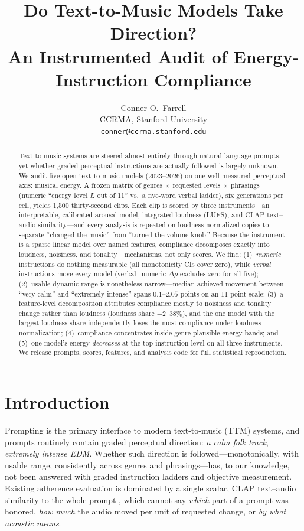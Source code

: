 \documentclass{article}
\title{Do Text-to-Music Models Take Direction?\\
An Instrumented Audit of Energy-Instruction Compliance}
\author{Conner O.\ Farrell\\
  CCRMA, Stanford University\\
  \texttt{conner@ccrma.stanford.edu}}
\begin{document}
\maketitle

\begin{abstract}
Text-to-music systems are steered almost entirely through natural-language prompts, yet whether graded perceptual instructions are actually followed is largely unknown. We audit five open text-to-music models
(2023--2026) on one well-measured perceptual axis: musical energy. A frozen matrix of genres $\times$ requested levels $\times$ phrasings (numeric ``energy level $L$ out of 11'' vs.\ a five-word verbal ladder), six generations per cell, yields 1{,}500 thirty-second clips. Each clip is scored by three instruments---an
interpretable, calibrated arousal model, integrated loudness (LUFS), and CLAP
text--audio similarity---and every analysis is repeated on loudness-normalized
copies to separate ``changed the music'' from ``turned the volume knob.''
Because the instrument is a sparse linear model over named features, compliance decomposes exactly into loudness, noisiness, and tonality---mechanisms, not only scores. We find:
(1)~\emph{numeric} instructions do nothing measurable (all monotonicity CIs
cover zero), while \emph{verbal} instructions move every model (verbal$-$numeric
$\Delta\rho$ excludes zero for all five); (2)~usable dynamic range is
nonetheless narrow---median achieved movement between ``very calm'' and
``extremely intense'' spans $0.1$--$2.05$ points on an 11-point scale;
(3)~a feature-level decomposition attributes compliance mostly to noisiness and
tonality change rather than loudness (loudness share $-2$--$38\%$), and the one
model with the largest loudness share independently loses the most compliance
under loudness normalization; (4)~compliance concentrates inside
genre-plausible energy bands; and (5)~one model's energy \emph{decreases} at the
top instruction level on all three instruments. We release prompts, scores,
features, and analysis code for full statistical reproduction.
\end{abstract}

\section{Introduction}
\label{sec:intro}

Prompting is the primary interface to modern text-to-music (TTM) systems, and
prompts routinely contain graded perceptual direction: \emph{a calm folk
track}, \emph{extremely intense EDM}. Whether such direction is followed---monotonically, with usable range,
consistently across genres and phrasings---has, to our knowledge, not been
answered with graded instruction ladders and objective measurement. Existing adherence evaluation is dominated by a single scalar,
CLAP text--audio similarity to the whole prompt \citep{evalsurvey2025}, which
cannot say \emph{which} part of a prompt was honored, \emph{how much} the audio
moved per unit of requested change, or \emph{by what acoustic means}.
\end{document}
